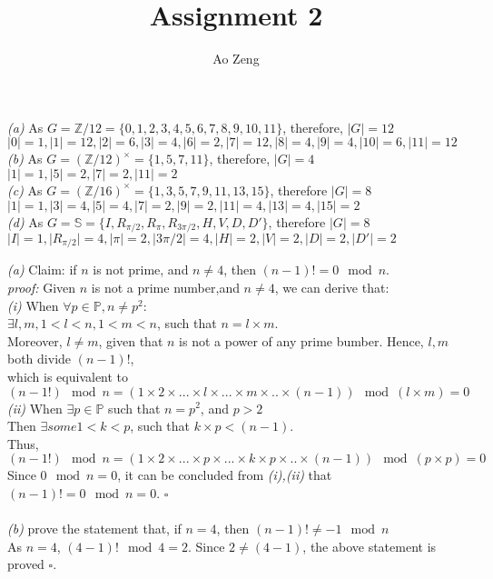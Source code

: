 \documentclass[11pt]{article}
\newcommand{\abs}[1]{\lvert #1 \rvert}
\newenvironment{problem}[2][Problem]{\begin{trivlist}
\item[\hskip \labelsep {\bfseries #1}\hskip \labelsep {\bfseries #2.}]}{\end{trivlist}}
\begin{document}
\title{Assignment 2}
\author{Ao Zeng}
\maketitle
\begin{problem}{1}
\textit{(a)} As $G = \mathbb{Z} / 12 = \{ 0,1,2,3,4,5,6,7,8,9,10,11 \}$, therefore, $\abs{G} = 12$\\
$\abs{0} = 1, \abs{1} = 12, \abs{2} = 6, \abs{3} = 4, \abs{6} = 2, \abs{7} =12 , \abs{8} = 4, \abs{9} = 4, \abs{10} = 6, \abs{11}=12$\\
\textit{(b)} As $G = (\mathbb{Z}/12)^{\times} = \{ 1,5,7,11\}$, therefore, $\abs{G} = 4$\\
$\abs{1} = 1, \abs{5} = 2, \abs{7} = 2, \abs{11} = 2$\\
\textit{(c)} As $G = (\mathbb{Z}/16)^{\times} = \{ 1, 3, 5, 7, 9, 11, 13, 15 \}$, therefore $\abs{G} = 8$\\
$\abs{1} = 1, \abs{3} = 4, \abs{5} = 4, \abs{7} = 2, \abs{9} = 2, \abs{11} = 4, \abs{13} = 4, \abs{15} = 2$\\
\textit{(d)} As $G = \mathbb{S} = \{ I, R_{\pi/2}, R_{\pi}, R_{3\pi/2}, H, V, D, D' \}$, therefore $\abs{G} = 8$\\
$\abs{I} = 1, \abs{R_{\pi/2}} = 4, \abs{\pi} = 2, \abs{3\pi/2} = 4,\abs{H} = 2, \abs{V} = 2, \abs{D} = 2, \abs{D'} = 2$\\
\end{problem}

\begin{problem}{2}
\textit{(a)}  Claim: if $n$ is not prime, and $n\neq 4$, then $(n-1)! = 0 \mod n$.\\
\textit{proof:} Given $n$ is not a prime number,and $n\neq 4$, we can derive that:\\
\textit{(i)} When $\forall p \in \mathbb{P}, n\neq p^2$:\\
 $\exists l,m, 1<l<n, 1<m<n$, such that $ n = l \times m$.\\
Moreover, $l\neq m$, given that $n$ is not a power of any prime bumber.
Hence, $l, m$ both divide $(n-1)!$,\\
which is equivalent to $( n-1!) \mod n = (1\times 2 \times ... \times l \times ... \times m \times .. \times (n-1)) \mod (l \times m) = 0 $\\
\textit{(ii)} When $\exists p \in \mathbb{P}$ such that $n = p^2$, and $p>2$\\
Then $\exists some 1<k<p$, such that $k\times p <(n-1)$.\\
Thus, $( n-1!) \mod n = (1\times 2 \times ... \times p \times ... \times k\times p \times .. \times (n-1)) \mod (p \times p) = 0 $\\
Since $0 \mod n = 0$, it can be concluded from \textit{(i),(ii)} that $(n-1)! = 0 \mod n = 0$. $\square$\\
\\
\textit{(b)} prove the statement that, if $n = 4$, then $(n-1)!\neq -1 \mod n$\\
As $n = 4$, $(4-1)! \mod 4 = 2$. Since $2\neq (4-1)$, the above statement is proved $\square$.\\
\end{problem}
\end{document}
